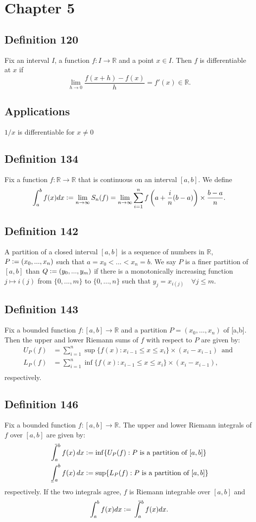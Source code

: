 \documentclass{article}
\def\upint{\mathchoice%
    {\mkern13mu\overline{\vphantom{\intop}\mkern7mu}\mkern-20mu}%
    {\mkern7mu\overline{\vphantom{\intop}\mkern7mu}\mkern-14mu}%
    {\mkern7mu\overline{\vphantom{\intop}\mkern7mu}\mkern-14mu}%
    {\mkern7mu\overline{\vphantom{\intop}\mkern7mu}\mkern-14mu}%
  \int}
\def\lowint{\mkern3mu\underline{\vphantom{\intop}\mkern7mu}\mkern-10mu\int}
\begin{document}
\section*{Chapter 5}
\subsection{Definition 120}
Fix an interval $I$, a function $f:I \to \mathbb{R}$ and a point $x \in I$. Then
$f$ is differentiable at $x$ if \[
\lim_{h \to 0}\frac{f(x+h)-f(x)}{h} = f'(x) \in \mathbb{R}.
\]
\subsection*{Applications}
$1/x$ is differentiable for $x \neq 0$
\subsection{Definition 134}
Fix a function $f: \mathbb{R} \to \mathbb{R}$ that is continuous on an interval $[a,b]$.
We define \[
\int_{a}^{b}f(x)dx \vcentcolon= \lim_{n \to \infty}S_n(f) = \lim_{n \to \infty}\sum_{i=1}^{n} f \left( a+\frac{i}{n}(b-a) \right) \times \frac{b-a}{n}.
\]
\subsection{Definition 142}
A partition of a closed interval $[a,b]$ is a sequence of numbers in $\mathbb{R}$, $P \vcentcolon= (x_0,...,x_n)$
such that $a = x_0 <...<x_n = b$. We say $P$ is a finer partition of $[a,b]$ than $Q \vcentcolon= (y_0,...,y_m)$ if
there is a monotonically increasing function $j \mapsto i(j)$ from $\{0,...,m \}$ to $\{0,...,n \}$
such that $y_j = x_{i(j)} \quad \forall j \leq m$.
\subsection{Definition 143}
Fix a bounded function $f:[a,b] \to \mathbb{R}$ and a partition $P = (x_0,\hdots,x_n)$ of [a,b]. Then
the upper and lower Riemann sums of $f$ with respect to $P$ are given by: \begin{align*}
U_{P}(f) &= \sum_{i=1}^{n} \sup \{ f(x):x_{i-1} \leq x \leq x_i\} \times (x_{i} - x_{i-1}) \, \text{ and } \\
L_{P}(f) &= \sum_{i=1}^{n} \inf \{ f(x):x_{i-1} \leq x \leq x_i\} \times (x_i-x_{i-1}), \\
\end{align*}
respectively.
\subsection{Definition 146}
Fix a bounded function $f:[a,b] \to \mathbb{R}$. The upper and lower Riemann integrals of $f$
over $[a,b]$ are given by:
\begin{align*}
\upint_a^b f(x)\,dx &\vcentcolon= \inf \{ U_{P}(f):P \text{ is a partition of } [a,b] \} \\
   \lowint_a^b f(x)\,dx &\vcentcolon= \sup \{ L_{P}(f):P \text{ is a partition of } [a,b] \} \\
\end{align*}
respectively. If the two integrals agree, $f$ is Riemann integrable over $[a,b]$ and
$$ \int_a^bf(x)dx \vcentcolon= \upint_a^b f(x)dx.$$
\end{document}

